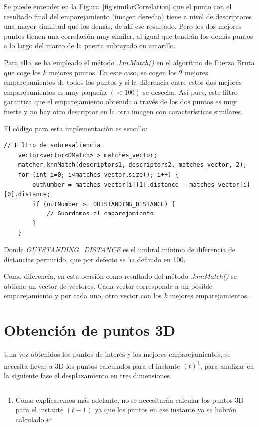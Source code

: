 \begin{itemize}
Se puede entender en la Figura~\ref{fig:similarCorrelation} que el punto con el resultado final del emparejamiento (imagen derecha) tiene a nivel de descriptores una mayor similitud que los demás, de ahí ese resultado. Pero los dos mejores puntos tienen una correlación muy similar, al igual que tendrán los demás puntos a lo largo del marco de la puerta subrayado en amarillo.

Para ello, se ha empleado el método \textit{.knnMatch()} en el algoritmo de Fuerza Bruta que coge los $k$ mejores puntos. En este caso, se cogen los 2 mejores emparejamientos de todos los puntos y si la diferencia entre estos dos mejores emparejamientos es muy paqueña $(< 100)$ se desecha. Así pues, este filtro garantiza que el emparejamiento obtenido a través de los dos puntos es muy fuerte y no hay otro descriptor en la otra imagen con características similares.

El código para esta implementación es sencillo:

\begin{lstlisting}[style=CStyle]
	// Filtro de sobresaliencia
	vector<vector<DMatch> > matches_vector;
	matcher.knnMatch(descriptors1, descriptors2, matches_vector, 2);
	for (int i=0; i<matches_vector.size(); i++) {
		outNumber = matches_vector[i][1].distance - matches_vector[i][0].distance;
		if (outNumber >= OUTSTANDING_DISTANCE) {
			// Guardamos el emparejamiento
		}
	}
\end{lstlisting}

Donde \textit{OUTSTANDING\_DISTANCE} es el umbral mínimo de diferencia de distancias permitido, que por defecto se ha definido en 100.

Como diferencia, en esta ocasión como resultado del método \textit{.knnMatch()} se obtiene un vector de vectores. Cada vector corresponde a un posible emparejamiento y por cada uno, otro vector con los $k$ mejores emparejamientos.

\end{itemize}

\section{Obtención de puntos 3D}

Una vez obtenidos los puntos de interés y los mejores emparejamientos, se necesita llevar a 3D los puntos calculados para el instante $(t)$\footnote{Como explicaremos más adelante, no se necesitarán calcular los puntos 3D para el instante $(t-1)$ ya que los puntos en ese instante ya se habrán calculado.}, para analizar en la siguiente fase el desplazamiento en tres dimensiones.

